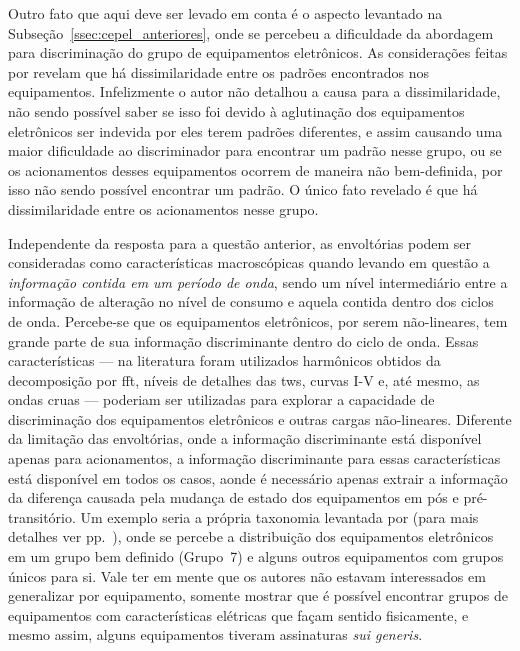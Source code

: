 Outro fato que aqui deve ser levado em conta é o aspecto levantado na
Subseção~\ref{ssec:cepel_anteriores}, onde se percebeu a dificuldade
da abordagem para discriminação do grupo de equipamentos eletrônicos.  As
considerações feitas por \citeauthor*{nilm_cepel_alvaro} revelam que
há dissimilaridade entre os padrões encontrados nos equipamentos.
Infelizmente o autor não detalhou a causa para a dissimilaridade, não
sendo possível saber se isso foi devido à aglutinação dos equipamentos
eletrônicos ser indevida por eles terem padrões diferentes,
e assim causando uma maior dificuldade ao discriminador para encontrar
um padrão nesse grupo, ou se os acionamentos desses equipamentos ocorrem
de maneira não bem-definida, por isso não sendo possível encontrar um
padrão. O único fato revelado é que há dissimilaridade entre os
acionamentos nesse grupo.

Independente da resposta para a questão anterior, as envoltórias podem
ser consideradas como características macroscópicas quando levando em
questão a \emph{informação contida em um período de onda}, sendo um nível
intermediário entre a informação de alteração no nível de consumo e
aquela contida dentro dos ciclos de onda. Percebe-se que os equipamentos
eletrônicos, por serem não-lineares, tem grande parte de sua
informação discriminante dentro do ciclo de onda. Essas
características --- na literatura foram utilizados harmônicos obtidos da
decomposição por \gls{fft}, níveis de detalhes das \glspl{tw}, curvas
I-V e, até mesmo, as ondas cruas --- poderiam ser utilizadas para
explorar a capacidade de discriminação dos equipamentos eletrônicos e
outras cargas não-lineares. Diferente da limitação das envoltórias,
onde a informação discriminante está disponível apenas para
acionamentos, a informação discriminante para essas características
está disponível em todos os casos, aonde é
necessário apenas extrair a informação da diferença causada pela
mudança de estado dos equipamentos em pós e pré-transitório. Um exemplo
seria a própria taxonomia levantada por \citet{nilm_lam_2007_33} (para
mais detalhes ver pp.~\pageref{nilm:curvas_iv}), onde se percebe a
distribuição dos equipamentos eletrônicos em um grupo bem definido
(Grupo~7) e alguns outros equipamentos com grupos únicos para si. Vale
ter em mente que os autores não estavam interessados em generalizar
por equipamento, somente mostrar que é possível encontrar grupos de
equipamentos com características elétricas que façam sentido fisicamente,
e mesmo assim, alguns equipamentos tiveram assinaturas \emph{sui
generis}.

